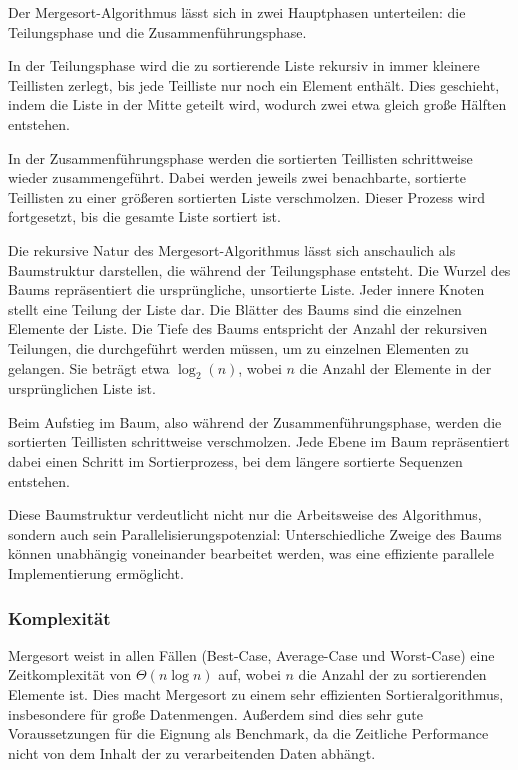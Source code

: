 \documentclass[fontsize=12pt,paper=a4,twoside=semi,parskip=half-,headsepline,headinclude]{scrreprt}
\begin{document}
Der Mergesort-Algorithmus lässt sich in zwei Hauptphasen unterteilen: die Teilungsphase und die Zusammenführungsphase.

In der Teilungsphase wird die zu sortierende Liste rekursiv in immer kleinere Teillisten zerlegt, bis jede Teilliste nur noch ein Element enthält. Dies geschieht, indem die Liste in der Mitte geteilt wird, wodurch zwei etwa gleich große Hälften entstehen.

In der Zusammenführungsphase werden die sortierten Teillisten schrittweise wieder zusammengeführt. Dabei werden jeweils zwei benachbarte, sortierte Teillisten zu einer größeren sortierten Liste verschmolzen. Dieser Prozess wird fortgesetzt, bis die gesamte Liste sortiert ist.

Die rekursive Natur des Mergesort-Algorithmus lässt sich anschaulich als Baumstruktur darstellen, die während der Teilungsphase entsteht. Die Wurzel des Baums repräsentiert die ursprüngliche, unsortierte Liste. Jeder innere Knoten stellt eine Teilung der Liste dar. Die Blätter des Baums sind die einzelnen Elemente der Liste. Die Tiefe des Baums entspricht der Anzahl der rekursiven Teilungen, die durchgeführt werden müssen, um zu einzelnen Elementen zu gelangen. Sie beträgt etwa $\log_2(n)$, wobei $n$ die Anzahl der Elemente in der ursprünglichen Liste ist.

Beim Aufstieg im Baum, also während der Zusammenführungsphase, werden die sortierten Teillisten schrittweise verschmolzen. Jede Ebene im Baum repräsentiert dabei einen Schritt im Sortierprozess, bei dem längere sortierte Sequenzen entstehen.

Diese Baumstruktur verdeutlicht nicht nur die Arbeitsweise des Algorithmus, sondern auch sein Parallelisierungspotenzial: Unterschiedliche Zweige des Baums können unabhängig voneinander bearbeitet werden, was eine effiziente parallele Implementierung ermöglicht.

\subsubsection{Komplexität}

Mergesort weist in allen Fällen (Best-Case, Average-Case und Worst-Case) eine Zeitkomplexität von $\Theta(n \log n)$ auf, wobei $n$ die Anzahl der zu sortierenden Elemente ist. Dies macht Mergesort zu einem sehr effizienten Sortieralgorithmus, insbesondere für große Datenmengen. Außerdem sind dies sehr gute Voraussetzungen für die Eignung als Benchmark, da die Zeitliche Performance nicht von dem Inhalt der zu verarbeitenden Daten abhängt.\cite{Cormen2022}
\end{document}
